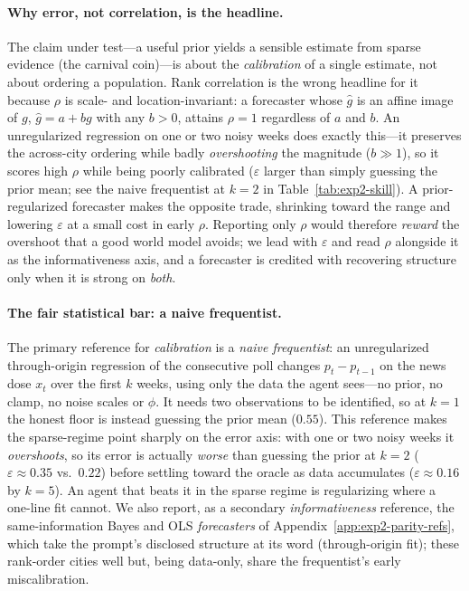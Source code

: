 \paragraph{Why error, not correlation, is the headline.}  The claim under test---a useful prior yields
a sensible estimate from sparse evidence (the carnival coin)---is about the \emph{calibration} of a
single estimate, not about ordering a population.  Rank correlation is the wrong headline for it
because $\rho$ is scale- and location-invariant: a forecaster whose $\hat g$ is an affine image of
$g$, $\hat g=a+bg$ with any $b>0$, attains $\rho=1$ regardless of $a$ and $b$.  An unregularized
regression on one or two noisy weeks does exactly this---it preserves the across-city ordering while
badly \emph{overshooting} the magnitude ($b\gg1$), so it scores high $\rho$ while being poorly
calibrated ($\varepsilon$ larger than simply guessing the prior mean; see the naive frequentist at
$k{=}2$ in Table~\ref{tab:exp2-skill}).  A prior-regularized forecaster makes the opposite trade,
shrinking toward the range and lowering $\varepsilon$ at a small cost in early $\rho$.  Reporting only
$\rho$ would therefore \emph{reward} the overshoot that a good world model avoids; we lead with
$\varepsilon$ and read $\rho$ alongside it as the informativeness axis, and a forecaster is credited
with recovering structure only when it is strong on \emph{both}.

\paragraph{The fair statistical bar: a naive frequentist.}  The primary reference for
\emph{calibration} is a \emph{naive frequentist}: an unregularized through-origin regression of the
consecutive poll changes $p_t-p_{t-1}$ on the news dose $x_t$ over the first $k$ weeks, using only
the data the agent sees---no prior, no clamp, no noise scales or $\phi$.  It needs two observations
to be identified, so at $k{=}1$ the honest floor is instead guessing the prior mean ($0.55$).  This
reference makes the sparse-regime point sharply on the error axis: with one or two noisy weeks it
\emph{overshoots}, so its error is actually \emph{worse} than guessing the prior at $k{=}2$
($\varepsilon\approx0.35$ vs.\ $0.22$) before settling toward the oracle as data accumulates
($\varepsilon\approx0.16$ by $k{=}5$).  An agent that beats it in the sparse regime is regularizing
where a one-line fit cannot.  We also report, as a secondary \emph{informativeness} reference, the
same-information Bayes and OLS \emph{forecasters} of Appendix~\ref{app:exp2-parity-refs}, which take
the prompt's disclosed structure at its word (through-origin fit); these rank-order cities well but,
being data-only, share the frequentist's early miscalibration.

